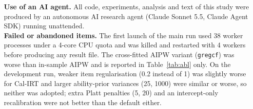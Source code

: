 \textbf{Use of an AI agent.} All code, experiments, analysis and text of this study were produced by an autonomous AI research agent (Claude Sonnet 5.5, Claude Agent SDK) running unattended.\\
\textbf{Failed or abandoned items.} The first launch of the main run used 38 worker processes under a 4-core CPU quota and was killed and restarted with 4 workers before producing any result file. The cross-fitted AIPW variant (\texttt{gregcf}) was worse than in-sample AIPW and is reported in Table~\ref{tab:abl} only. On the development run, weaker item regularisation (0.2 instead of 1) was slightly worse for Cal-IRT and larger ability-prior variances (25, 1000) were similar or worse, so neither was adopted; extra Platt penalties (5, 20) and an intercept-only recalibration were not better than the default either.
